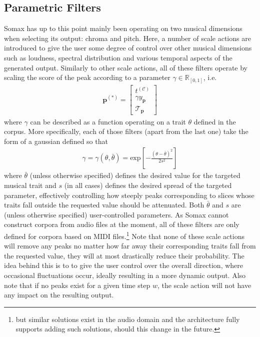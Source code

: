 \subsection{Parametric Filters}
Somax has up to this point mainly been operating on two musical dimensions when selecting its output: chroma and pitch. Here, a number of scale actions are introduced to give the user some degree of control over other musical dimensions such as loudness, spectral distribution and various temporal aspects of the generated output.  Similarly to other scale actions, all of these filters operate by scaling the score of the peak according to a parameter $\gamma \in \mathbb R_{[0,1]}$, i.e.
	\begin{align}\label{eq:filter-scaling}
		\bm p^{(\ast)} = \begin{bmatrix}
			t^{(\mathcal C)} \\ \gamma y_{\bm p} \\ \mathcal T_{\bm p}
		\end{bmatrix}
	\end{align}
	where $\gamma$ can be described as a function operating on a trait $\theta$  defined in the corpus. More specifically, each of those filters (apart from the last one) take the form of a gaussian defined so that
	\begin{align}
		\gamma = \gamma\left(\theta,\bar{\theta}\right) = \text{exp}\left[-\frac{(\theta-\bar{\theta})^2}{2s^2}\right]
	\end{align}
	where $\bar{\theta}$ (unless otherwise specified) defines the desired value for the targeted musical trait and $s$ (in all cases) defines the desired spread of the targeted parameter, effectively controlling how steeply peaks corresponding to slices whose traits fall outside the requested value should be attenuated. Both $\bar{\theta}$ and $s$ are (unless otherwise specified) user-controlled parameters. As Somax cannot construct corpora from audio files at the moment, all of these filters are only defined for corpora based on MIDI files.\footnote{but similar solutions exist in the audio domain and the architecture fully supports adding such solutions, should this change in the future.} Note that none of these scale actions will remove any peaks no matter how far away their corresponding traits fall from the requested value, they will at most drastically reduce their probability. The idea behind this is to to give the user control over the overall direction, where occasional fluctuations occur, ideally resulting in a more dynamic output. Also note that if no peaks exist for a given time step $w$, the scale action will not have any impact on the resulting output.
	

